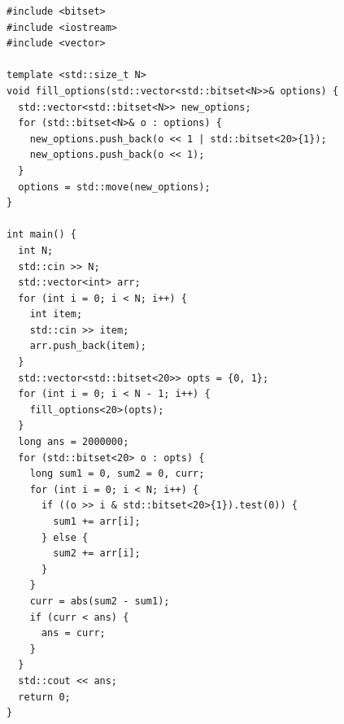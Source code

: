 \begin{lstlisting}
#include <bitset>
#include <iostream>
#include <vector>

template <std::size_t N>
void fill_options(std::vector<std::bitset<N>>& options) {
  std::vector<std::bitset<N>> new_options;
  for (std::bitset<N>& o : options) {
    new_options.push_back(o << 1 | std::bitset<20>{1});
    new_options.push_back(o << 1);
  }
  options = std::move(new_options);
}

int main() {
  int N;
  std::cin >> N;
  std::vector<int> arr;
  for (int i = 0; i < N; i++) {
    int item;
    std::cin >> item;
    arr.push_back(item);
  }
  std::vector<std::bitset<20>> opts = {0, 1};
  for (int i = 0; i < N - 1; i++) {
    fill_options<20>(opts);
  }
  long ans = 2000000;
  for (std::bitset<20> o : opts) {
    long sum1 = 0, sum2 = 0, curr;
    for (int i = 0; i < N; i++) {
      if ((o >> i & std::bitset<20>{1}).test(0)) {
        sum1 += arr[i];
      } else {
        sum2 += arr[i];
      }
    }
    curr = abs(sum2 - sum1);
    if (curr < ans) {
      ans = curr;
    }
  }
  std::cout << ans;
  return 0;
}
\end{lstlisting}